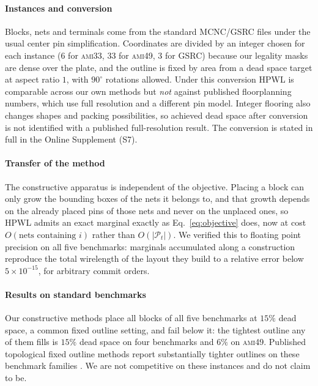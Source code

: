 \documentclass[preprint,12pt,authoryear]{elsarticle}
\newcommand{\cP}{\mathcal{P}}
\begin{document}
\paragraph{Instances and conversion}
Blocks, nets and terminals come from the standard MCNC/GSRC files under the
usual center pin simplification. Coordinates are divided by an integer chosen
for each instance ($6$ for \textsc{ami33}, $33$ for \textsc{ami49}, $3$ for GSRC)
because our legality masks are dense over the plate, and the outline is fixed
by area from a dead space target at aspect ratio $1$, with $90^\circ$
rotations allowed. Under this conversion HPWL is comparable across our own
methods but \emph{not} against published floorplanning numbers, which use full
resolution and a different pin model. Integer flooring also changes shapes and
packing possibilities, so achieved dead space after conversion is not identified
with a published full-resolution result. The conversion is stated in full in the
Online Supplement (S7).

\paragraph{Transfer of the method}
The constructive apparatus is independent of the objective.
Placing a block can only grow the bounding boxes of the nets it belongs to, and
that growth depends on the already placed pins of those nets and never on the
unplaced ones, so HPWL admits an exact marginal exactly as
Eq.~\eqref{eq:objective} does, now at cost $O(\text{nets containing } i)$
rather than $O(|\cP_t|)$. We verified this to floating point precision on all
five benchmarks: marginals accumulated along a construction reproduce the total
wirelength of the layout they build to a relative error below $5\times10^{-15}$,
for arbitrary commit orders.

\paragraph{Results on standard benchmarks}
Our constructive methods place all blocks of all five benchmarks at $15\%$ dead
space, a common fixed outline setting, and fail below it: the tightest outline any
of them fills is $15\%$ dead space on four benchmarks and $6\%$ on
\textsc{ami49}. Published topological fixed outline methods report substantially
tighter outlines on these benchmark families
\citep{Murata1996SequencePair,Chang2000BStar,Adya2003FixedOutline}.
We are not competitive on these instances and do not claim to be.
\end{document}
